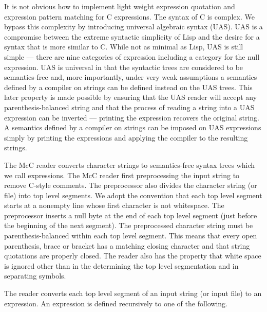 \documentclass{article}
\begin{document}
It is not obvious how to implement light weight expression quotation and expression pattern matching for C expressions.  The syntax of C is complex.  We bypass this complexity by introducing universal algebraic syntax (UAS).
UAS is a compromise between the extreme syntactic simplicity of Lisp and the desire for a syntax that is more similar to C.
While not as minimal as Lisp, UAS is still simple --- there are nine categories of expression including a category for the null expression.
UAS is universal in that the syntactic trees are considered to be semantics-free and, more importantly, under very weak assumptions a semantics defined by a compiler on strings
can be defined instead on the UAS trees.
This later property is made possible by ensuring that the UAS reader will accept any parenthesis-balanced string
and that the process of reading a string into a UAS expression can be inverted --- printing the expression recovers the original string.
A semantics defined by a compiler on strings can be imposed on UAS expressions simply by printing the expressions and applying the compiler to the resulting strings.

The McC reader converts character strings to semantics-free syntax trees which we call expressions.
The McC reader first preprocessing the input string to remove C-style comments.
The preprocessor also divides the character string (or file) into top level segments.
We adopt the convention that each top level segment starts at a nonempty line whose first character is not whitespace.
The preprocessor inserts a null byte at the end of each top level segment (just before the beginning of the next segment).
The preprocessed character string must be parenthesis-balanced within each top level segment.  This means that every open parenthesis, brace or bracket has a matching closing character and that string quotations
are properly closed.  The reader also has the property that white space is ignored other than in the determining the top level segmentation and in separating symbols.

The reader converts each top level segment of an input string (or input file) to an expression.
An expression is defined recursively to one of the following.
\end{document}
